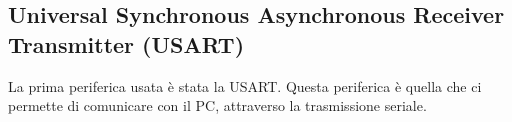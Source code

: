 \pagebreak
\subsection{Universal Synchronous Asynchronous Receiver Transmitter (USART)}
La prima periferica usata è stata la USART. Questa periferica è quella che ci permette di comunicare con il PC, attraverso la trasmissione seriale.\\
